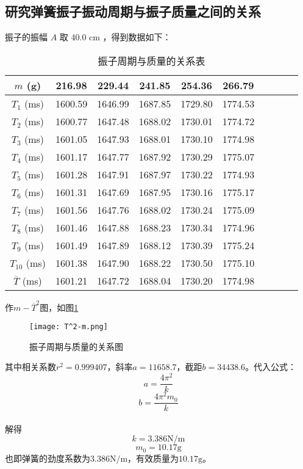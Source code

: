 \documentclass[11pt]{article}
\begin{document}
	\subsection{研究弹簧振子振动周期与振子质量之间的关系}
	振子的振幅 $A$  取 40.0 cm ，得到数据如下：
	\begin{table}[H]\centering
		\caption{振子周期与质量的关系表}
		\label{振子周期与质量的关系}
		\begin{tabular}{cccccccccc}\toprule
			$m $ (g) & 216.98 & 229.44 & 241.85 & 254.36 & 266.79  \\
			\midrule
			$T_1$ (ms) &1600.59	&1646.99	&1687.85	&1729.80	&1774.53 \\
			$T_2$ (ms) &1600.77	&1647.48	&1688.02	&1730.01	&1774.72 \\
			$T_3$ (ms) &1601.05	&1647.93	&1688.01	&1730.10	&1774.98 \\
			$T_4$ (ms) &1601.17	&1647.77	&1687.92	&1730.29	&1775.07 \\
			$T_5$ (ms) &1601.28	&1647.91	&1687.97	&1730.22	&1774.93 \\
			$T_6$ (ms) &1601.31	&1647.69	&1687.95	&1730.16	&1775.17 \\
			$T_7$ (ms) &1601.56	&1647.76	&1688.02	&1730.24	&1775.09 \\
			$T_8$ (ms) &1601.46	&1647.88	&1688.23	&1730.34	&1774.96 \\
			$T_9$ (ms) &1601.49	&1647.89	&1688.12	&1730.39	&1775.24 \\
			$T_{10}$ (ms) &1601.38	&1647.90	&1688.22	&1730.50	&1775.10 \\
			$\overline{T}$ (ms) &1601.21	&1647.72	&1688.04	&1730.20	&1774.98 \\
			\bottomrule
		\end{tabular}
	\end{table}
	作$m-\overline{T}^2$图，如图\ref{fig:T^2-m}
	\begin{figure}[H]
		\centering
		\texttt{[image: T^2-m.png]}
		\caption{振子周期与质量的关系图}
		\label{fig:T^2-m}
	\end{figure}
	其中相关系数$r^2=0.999407$，斜率$a=11658.7$，截距$b=34438.6$。代入公式：
	\[a=\frac{4\pi^2}{k}\]
	\[b=\frac{4\pi^2m_0}{k}\]\\
	解得
	\[k=3.386\mathrm{N/m}\]
	\[m_0=10.17\mathrm{g}\]
	也即弹簧的劲度系数为$3.386\mathrm{N/m}$，有效质量为$10.17\mathrm{g}$。
	
\end{document}
